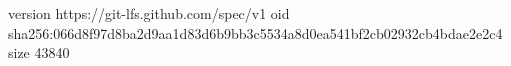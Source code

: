 version https://git-lfs.github.com/spec/v1
oid sha256:066d8f97d8ba2d9aa1d83d6b9bb3c5534a8d0ea541bf2cb02932cb4bdae2e2c4
size 43840
